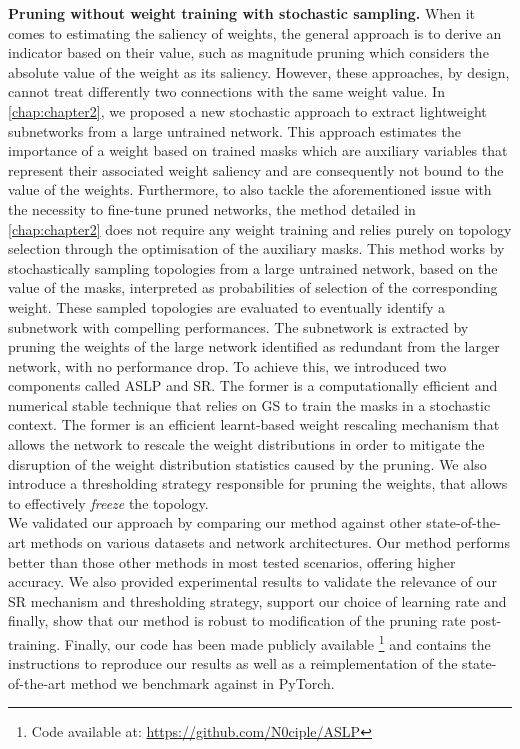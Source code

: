 \noindent \textbf{Pruning without weight training with stochastic sampling.}
When it comes to estimating the saliency of weights, the general approach is to
derive an indicator based on their value, such as magnitude pruning which
considers the absolute value of the weight as its saliency. However, these
approaches, by design, cannot treat differently two connections with the same
weight value. In \cref{chap:chapter2}, we proposed a new stochastic approach to
extract lightweight subnetworks from a large untrained network. This approach
estimates the importance of a weight based on trained masks which are auxiliary
variables that represent their associated weight saliency and are consequently
not bound to the value of the weights. Furthermore, to also tackle the
aforementioned issue with the necessity to fine-tune pruned networks, the method
detailed in \cref{chap:chapter2} does not require any weight training and relies
purely on topology selection through the optimisation of the auxiliary masks.
This method works by stochastically sampling topologies from a large untrained
network, based on the value of the masks, interpreted as probabilities of
selection of the corresponding weight. These sampled topologies are evaluated to
eventually identify a subnetwork with compelling performances. The subnetwork is
extracted by pruning the weights of the large network identified as redundant
from the larger network, with no performance drop. To achieve this, we
introduced two components called \acf{ASLP} and \acf{SR}. The former is a
computationally efficient and numerical stable technique that relies on \acl{GS}
to train the masks in a stochastic context. The former is an efficient
learnt-based weight rescaling mechanism that allows the network to rescale the
weight distributions in order to mitigate the disruption of the weight
distribution statistics caused by the pruning. We also introduce a thresholding
strategy responsible for pruning the weights, that allows to effectively
\emph{freeze} the topology.\\

We validated our approach by comparing our method against other state-of-the-art
methods on various datasets and network architectures. Our method performs
better than those other methods in most tested scenarios, offering higher
accuracy. We also provided experimental results to validate the relevance of our
\ac{SR} mechanism and thresholding strategy, support our choice of learning rate
and finally, show that our method is robust to modification of the pruning rate
post-training. Finally, our code has been made publicly available \footnote{Code
available at: \url{https://github.com/N0ciple/ASLP}} and contains the
instructions to reproduce our results as well as a reimplementation of the
state-of-the-art method we benchmark against in PyTorch.\\ 

